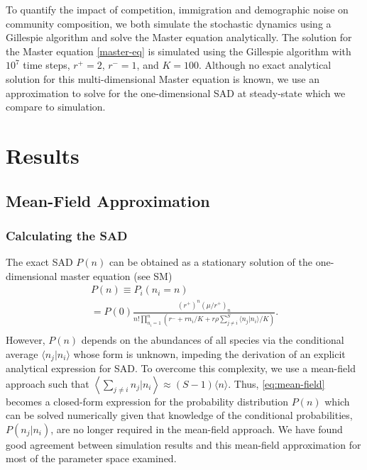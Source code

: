 \documentclass[9pt,twocolumn,twoside,lineno]{pnas-new}
\begin{document}
To quantify the impact of competition, immigration and demographic noise on community composition, we both simulate the stochastic dynamics using a Gillespie algorithm and solve the Master equation analytically.
The solution for the Master equation \eqref{master-eq} is simulated using the Gillespie algorithm with $10^7$ time steps, $r^+=2$, $r^-=1$, and $K=100$.
Although no exact analytical solution for this multi-dimensional Master equation is known, we use an approximation to solve for the one-dimensional SAD at steady-state which we compare to simulation.

\section{Results}

\subsection{Mean-Field Approximation}
\subsubsection{Calculating the SAD}
The exact SAD $P(n)$ can be obtained as a stationary solution of the one-dimensional master equation (see SM)
\begin{multline}
   P(n) \equiv P_i(n_i=n)\\
   =P(0)\frac{(r^+)^{n}(\mu/r^+)_{n}}{n!\prod_{n_i=1}^{n}\left(r^-+r n_i/K+r\rho \sum_{j\neq i}^S\langle n_j |n_i \rangle /K\right)}.\\
   \label{eq:mean-field}
\end{multline}
However, $P(n)$ depends on the abundances of all species via the conditional average $\langle n_j |n_i\rangle$ whose form is unknown, impeding the derivation of an explicit analytical expression for SAD. 
To overcome this complexity, %
we use a mean-field approach such that 
$\left\langle \sum_{j\neq i} n_j |n_i\right\rangle\approx  (S-1) \langle n \rangle$. %
Thus, \eqref{eq:mean-field} becomes a closed-form expression for the probability distribution $P(n)$ which can be solved numerically given that knowledge of the conditional probabilities, $P(n_j|n_i)$, are no longer required in the mean-field approach. 
We have found good agreement between simulation results and this mean-field approximation for most of the parameter space examined. 
\end{document}
